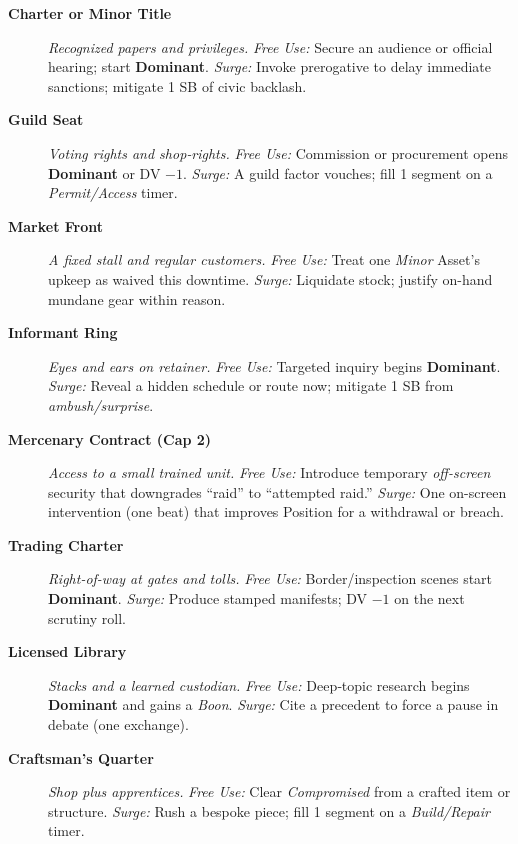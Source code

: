 \begin{description}
  \item[\textbf{Charter or Minor Title}]  \emph{Recognized papers and privileges.} \emph{Free Use:} Secure an audience or official hearing; start \textbf{Dominant}. \emph{Surge:} Invoke prerogative to delay immediate sanctions; mitigate 1 SB of civic backlash.

  \item[\textbf{Guild Seat}]  \emph{Voting rights and shop‑rights.} \emph{Free Use:} Commission or procurement opens \textbf{Dominant} or DV $-1$. \emph{Surge:} A guild factor vouches; fill 1 segment on a \emph{Permit/Access} timer.

  \item[\textbf{Market Front}]  \emph{A fixed stall and regular customers.} \emph{Free Use:} Treat one \emph{Minor} Asset's upkeep as waived this downtime. \emph{Surge:} Liquidate stock; justify on-hand mundane gear within reason.

  \item[\textbf{Informant Ring}]  \emph{Eyes and ears on retainer.} \emph{Free Use:} Targeted inquiry begins \textbf{Dominant}. \emph{Surge:} Reveal a hidden schedule or route now; mitigate 1 SB from \emph{ambush/surprise}.

  \item[\textbf{Mercenary Contract (Cap 2)}]  \emph{Access to a small trained unit.} \emph{Free Use:} Introduce temporary \emph{off-screen} security that downgrades ``raid'' to ``attempted raid.'' \emph{Surge:} One on-screen intervention (one beat) that improves Position for a withdrawal or breach.

  \item[\textbf{Trading Charter}]  \emph{Right-of-way at gates and tolls.} \emph{Free Use:} Border/inspection scenes start \textbf{Dominant}. \emph{Surge:} Produce stamped manifests; DV $-1$ on the next scrutiny roll.

  \item[\textbf{Licensed Library}]  \emph{Stacks and a learned custodian.} \emph{Free Use:} Deep‑topic research begins \textbf{Dominant} and gains a \emph{Boon}. \emph{Surge:} Cite a precedent to force a pause in debate (one exchange).

  \item[\textbf{Craftsman's Quarter}]  \emph{Shop plus apprentices.} \emph{Free Use:} Clear \emph{Compromised} from a crafted item or structure. \emph{Surge:} Rush a bespoke piece; fill 1 segment on a \emph{Build/Repair} timer.


\end{description}
